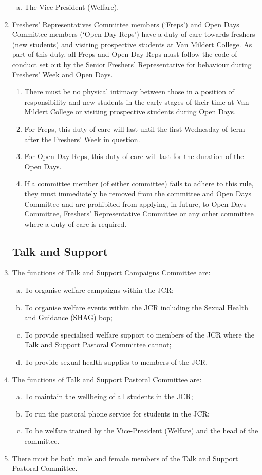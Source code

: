 \documentclass[12pt]{article}  %
\begin{document}
\begin{enumerate}
\begin{enumerate}[(a)]
		\item The Vice-President (Welfare).
	\end{enumerate}
	\item Freshers’ Representatives Committee members (‘Freps’) and Open Days Committee members (‘Open Day Reps’) have a duty of care towards freshers (new students) and visiting prospective students at Van Mildert College. As part of this duty, all Freps and Open Day Reps must follow the code of conduct set out by the Senior Freshers’ Representative for behaviour during Freshers’ Week and Open Days.
	\begin{enumerate}
		\item There must be no physical intimacy between those in a position of responsibility and new students in the early stages of their time at Van Mildert College or visiting prospective students during Open Days.
		\item For Freps, this duty of care will last until the first Wednesday of term after the Freshers’ Week in question.
		\item For Open Day Reps, this duty of care will last for the duration of the Open Days.
		\item If a committee member (of either committee) fails to adhere to this rule, they must immediately be removed from the committee and Open Days Committee and are prohibited from applying, in future, to Open Days Committee, Freshers’ Representative Committee or any other committee where a duty of care is required.
	\end{enumerate}
	\subsection{Talk and Support}
	\item The functions of Talk and Support Campaigns Committee are:
	\begin{enumerate}[(a)]
		\item To organise welfare campaigns within the JCR;
		\item To organise welfare events within the JCR including the Sexual Health and Guidance (SHAG) bop;
		\item To provide specialised welfare support to members of the JCR where the Talk and Support Pastoral Committee cannot;
		\item To provide sexual health supplies to members of the JCR.
	\end{enumerate}
	\item The functions of Talk and Support Pastoral Committee are:
	\begin{enumerate}[(a)]
		\item To maintain the wellbeing of all students in the JCR;
		\item To run the pastoral phone service for students in the JCR;
		\item To be welfare trained by the Vice-President (Welfare) and the head of the committee.
	\end{enumerate}
	\item There must be both male and female members of the Talk and Support Pastoral Committee.

\end{enumerate}
\end{document}
